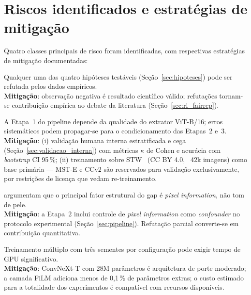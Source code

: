 \section{Riscos identificados e estratégias de mitigação}
\label{sec:riscos}

Quatro classes principais de risco foram identificadas, com respectivas estratégias de mitigação documentadas:

\begin{description}[font=\bfseries\sffamily]
\item[Risco~1 --- Resultados negativos.] Qualquer uma das quatro hipóteses testáveis (Seção~\ref{sec:hipoteses}) pode ser refutada pelos dados empíricos. \\
\textbf{Mitigação}: observação negativa é resultado científico válido; refutações tornam-se contribuição empírica ao debate da literatura (Seção~\ref{sec:rl_fairrep}).

\item[Risco~2 --- Qualidade do extrator MST próprio.] A Etapa~1 do pipeline depende da qualidade do extrator ViT-B/16; erros sistemáticos podem propagar-se para o condicionamento das Etapas~2 e~3. \\
\textbf{Mitigação}: (i) validação humana interna estratificada e cega (Seção~\ref{sec:validacao_interna}) com métricas $\kappa$ de Cohen e acurácia com \emph{bootstrap} CI 95\,\%; (ii) treinamento sobre STW~\cite{matias2026large} (CC BY 4.0, ~42k imagens) como base primária --- MST-E e CCv2 são reservados para validação exclusivamente, por restrições de licença que vedam re-treinamento.

\item[Risco~3 --- Refutação parcial por \emph{pixel information}.]  argumentam que o principal fator estrutural do gap é \emph{pixel information}, não tom de pele. \\
\textbf{Mitigação}: a Etapa~2 inclui controle de \emph{pixel information} como \emph{confounder} no protocolo experimental (Seção~\ref{sec:pipeline}). Refutação parcial converte-se em contribuição quantitativa.

\item[Risco~4 --- Limitação computacional.] Treinamento múltiplo com três sementes por configuração pode exigir tempo de GPU significativo. \\
\textbf{Mitigação}: ConvNeXt-T com 28M parâmetros é arquitetura de porte moderado; a camada FiLM adiciona menos de 0,1\,\% de parâmetros extras; o custo estimado para a totalidade dos experimentos é compatível com recursos disponíveis.
\end{description}